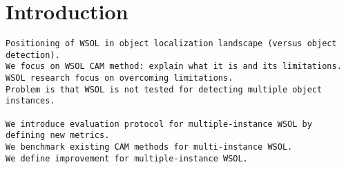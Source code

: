 \chapter{Introduction}

\begin{verbatim}
Positioning of WSOL in object localization landscape (versus object detection).
We focus on WSOL CAM method: explain what it is and its limitations.
WSOL research focus on overcoming limitations.
Problem is that WSOL is not tested for detecting multiple object instances.

We introduce evaluation protocol for multiple-instance WSOL by defining new metrics. 
We benchmark existing CAM methods for multi-instance WSOL.
We define improvement for multiple-instance WSOL.
\end{verbatim}
